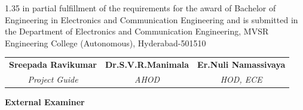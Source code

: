 \documentclass[12pt,a4paper]{article}
\begin{document}
\noindent
\begin{spacing}{1.35}
in partial fulfillment of the requirements for the award of Bachelor of Engineering in Electronics and Communication Engineering and is submitted in the Department of Electronics and Communication Engineering, MVSR Engineering College (Autonomous), Hyderabad-501510
\end{spacing}

\vspace{3.5cm}

\noindent
\begin{tabular*}{\textwidth}{@{\extracolsep{\fill}}ccc@{}}
    \textcolor{headerred}{\textbf{Sreepada Ravikumar}} & \textcolor{headerred}{\textbf{Dr.S.V.R.Manimala}} & \textcolor{headerred}{\textbf{Er.Nuli Namassivaya}} \\[0.25cm]
    \textcolor{titleplum}{\textit{Project Guide}} & \textcolor{titleplum}{\textit{AHOD}} & \textcolor{titleplum}{\textit{HOD, ECE}}
\end{tabular*}

\vspace{2cm}

\begin{center}
    {\large \textbf{\textcolor{titleplum}{External Examiner}}}
\end{center}
\end{document}
